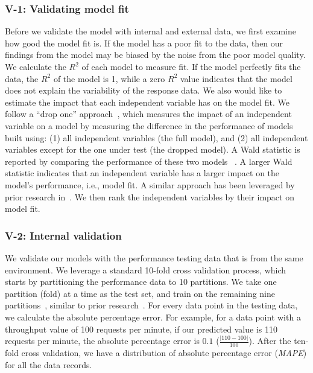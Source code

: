 \documentclass[smallextended]{svjour3}       %
\begin{document}
\subsubsection{V-1: Validating model fit}

Before we validate the model with internal and external data, we first examine how good the model fit is. If the model has a poor fit to the data, then our findings from the model may be biased by the noise from the poor model quality. We calculate the $R^2$ of each model to measure fit. If the model perfectly fits the data, the $R^2$ of the model is 1, while a zero $R^2$ value indicates that the model does not explain the variability of the response data. We also would like to estimate the impact that each independent variable has on the model fit. We follow a ``drop one'' approach~\cite{Chambers1990}, which measures the impact of an independent variable on a model by measuring the difference in the performance of models built using: (1) all independent variables (the full model), and (2) all independent variables except for the one under test (the dropped model). A Wald statistic is reported by comparing the performance of these two models ~\cite{harrell2001regression}. A larger Wald statistic indicates that an independent variable has a larger impact on the model's performance, i.e., model fit. A similar approach has been leveraged by prior research in~\cite{mcintosh2015emse}. We then rank the independent variables by their impact on model fit. 


\subsubsection{V-2: Internal validation}

We validate our models with the performance testing data that is from the same environment. We leverage a standard 10-fold cross validation process, which starts by partitioning the performance data to 10 partitions. We take one partition (fold) at a time as the test set, and train on the remaining nine partitions~\cite{10foldcross,kohavi1995study}, similar to prior research~\cite{haroon}. For every data point in the testing data, we calculate the absolute percentage error. For example, for a data point with a throughput value of 100 requests per minute, if our predicted value is 110 requests per minute, the absolute percentage error is $0.1$ ($\frac{|110-100|}{100}$). After the ten-fold cross validation, we have a distribution of absolute percentage error (\textit{MAPE}) for all the data records.
\end{document}
